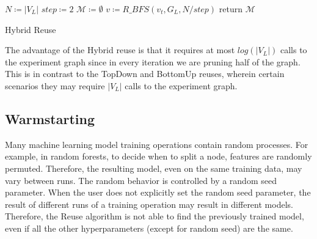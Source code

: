 \begin{algorithm}[h]
$N \coloneqq |V_L|$\;
$step \coloneqq 2$\;
$\mathcal{M} \coloneqq \emptyset$\;
$v \coloneqq R\_BFS(v_t, G_L, N/step)$\;
return $\mathcal{M}$\;
\caption{Hybrid Reuse}\label{algorithm-hybrid}
\end{algorithm}
The advantage of the Hybrid reuse is that it requires at most $log(|V_L|)$ calls to the experiment graph since in every iteration we are pruning half of the graph.
This is in contrast to the TopDown and BottomUp reuses, wherein certain scenarios they may require $|V_L|$ calls to the experiment graph.

\subsection{Warmstarting}
Many machine learning model training operations contain random processes.
For example, in random forests, to decide when to split a node, features are randomly permuted.
Therefore, the resulting model, even on the same training data, may vary between runs.
The random behavior is controlled by a random seed parameter.
When the user does not explicitly set the random seed parameter, the result of different runs of a training operation may result in different models.
Therefore, the Reuse algorithm is not able to find the previously trained model, even if all the other hyperparameters (except for random seed) are the same.

